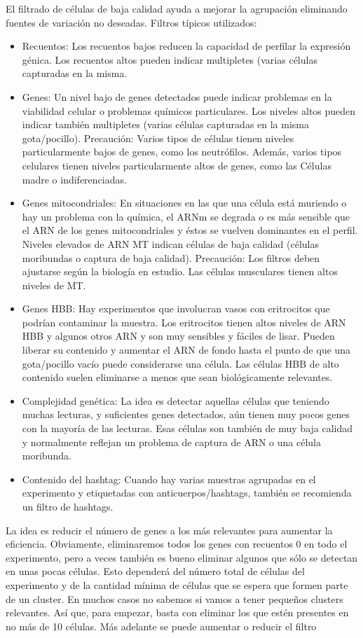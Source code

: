 El filtrado de células de baja calidad ayuda a mejorar la agrupación eliminando fuentes de variación no deseadas. Filtros típicos utilizados:
\begin{itemize}
\item Recuentos: Los recuentos bajos reducen la capacidad de perfilar la expresión génica. Los recuentos altos pueden indicar multipletes (varias células capturadas en la misma.
\item Genes: Un nivel bajo de genes detectados puede indicar problemas en la viabilidad celular
o problemas químicos particulares. Los niveles altos pueden indicar también multipletes (varias células capturadas en la misma gota/pocillo).
Precaución: Varios tipos de células tienen niveles particularmente bajos de genes, como
los neutrófilos. Además, varios tipos celulares tienen niveles particularmente altos de genes, como las
Células madre o indiferenciadas.
\item Genes mitocondriales:
En situaciones en las que una célula está muriendo o hay un problema con la química, el ARNm se degrada o es más sensible que el ARN de los genes mitocondriales y éstos se vuelven dominantes en el perfil. Niveles elevados de ARN MT indican células de baja calidad (células moribundas o captura de baja calidad). Precaución: Los filtros deben ajustarse según la biología en estudio. Las células musculares tienen altos niveles de MT.
\item Genes HBB: 
Hay experimentos que involucran vasos con eritrocitos que podrían contaminar la muestra. Los eritrocitos tienen altos niveles de ARN HBB y algunos otros ARN y son muy sensibles y fáciles de lisar. Pueden liberar su contenido y aumentar el ARN de fondo hasta el punto de que una gota/pocillo vacío puede considerarse una célula. Las células HBB de alto contenido suelen eliminarse a menos que sean biológicamente relevantes.
\item Complejidad genética:
La idea es detectar aquellas células que teniendo muchas lecturas, y suficientes genes detectados, aún tienen muy pocos genes con la mayoría de las lecturas. Esas células son también de muy baja calidad y normalmente reflejan un problema de captura de ARN o una célula moribunda.
\item Contenido del hashtag:
Cuando hay varias muestras agrupadas en el experimento y etiquetadas con anticuerpos/hashtags, también se recomienda un filtro de hashtags.
\end{itemize}

La idea es reducir el número de genes a los más relevantes para aumentar la eficiencia. Obviamente, eliminaremos todos los genes con recuentos 0 en todo el experimento, pero a veces también es bueno eliminar algunos que sólo se detectan en unas pocas células. Esto dependerá del número total de células del experimento y de la cantidad mínima de células que se espera que formen parte de un cluster. En muchos casos no sabemos si vamos a tener pequeños clusters relevantes. Así que, para empezar, basta con eliminar los que estén presentes en no más de 10 células. Más adelante se puede aumentar o reducir el filtro

